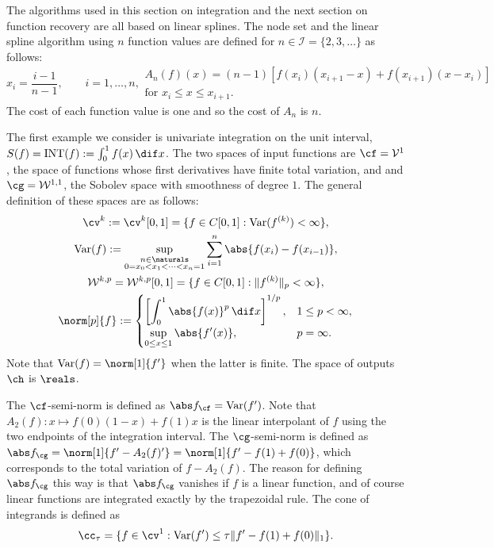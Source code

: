 The algorithms used in this section on integration and the next section on function recovery are all based on linear splines.  The node set and the linear spline algorithm using $n$ function values are defined for $n \in \mathcal{I}=\{2,3,\ldots\}$ as follows:
\begin{subequations} \label{linearspline}
\begin{equation}
x_i=\frac{i-1}{n-1}, \qquad i=1, \ldots, n,
\end{equation}
\begin{multline}
A_{n}(f)(x)=(n-1) \left[ f(x_{i})(x_{i+1}-x) +f(x_{i+1})(x-x_i) \right] \\ \text{for }x_i \leq x \leq x_{i+1}.
\end{multline}
\end{subequations}
The cost of each function value is one and so the cost of  $A_n$ is $n$.

The first example we consider is univariate integration on the unit interval, $S(f)=\INT(f):=\int_{0}^{1}f(x) \, \dif x$.  The two spaces of input functions are $\cf=\mathcal{V}^{1}$, the space of functions whose first derivatives have finite total variation, and and $\cg=\mathcal{W}^{1,1}$, the Sobolev space with smoothness of degree $1$.  The general definition of these spaces are as follows:
\begin{subequations} \label{defSobolev}
\begin{gather}
  \cv^{k}: =\cv^{k}[0,1]=\{f\in C[0,1]: \Var(f^{(k)}) < \infty \}, \\
  \Var(f) := \sup_{\substack{n \in \naturals\\ 0 = x_0 < x_1 < \cdots < x_{n} =1}} \sum_{i=1}^n \abs{f(x_i)-f(x_{i-1})}, \\
  \mathcal{W}^{k,p}=\mathcal{W}^{k,p}[0,1]=\{f\in C[0,1]: \|f^{(k)}\|_{p}<\infty\}, \\
\norm[p]{f}:= \begin{cases} \displaystyle \left[\int_0^1 \abs{f(x)}^p \, \dif x \right]^{1/p}, & 1 \le p < \infty,\\[1ex]
\displaystyle  \sup_{0 \le x \le 1} \abs{f'(x)}, & p=\infty.
\end{cases}
\end{gather}
\end{subequations}
Note that $\Var(f)=\norm[1]{f'}$ when the latter is finite.  The space of outputs $\ch$ is $\reals$.

The $\cf$-semi-norm is defined as $\Fnorm{f}=\Var(f')$.  Note that $A_2(f): x \mapsto f(0)(1-x)+f(1)x$ is the linear interpolant of $f$ using the two endpoints of the integration interval.  The $\cg$-semi-norm is defined as $\Gnorm{f}=\norm[1]{f'-A_2(f)'}=\norm[1]{f'-f(1)+f(0)}$, which corresponds to the total variation of $f-A_2(f)$.  The reason for defining $\Gnorm{f}$ this way is that $\Gnorm{f}$ vanishes if $f$ is a linear function, and of course linear functions are integrated exactly by the trapezoidal rule.  The cone of integrands is defined as
\begin{equation}\label{coneinteg}
\cc_{\tau}=\{f\in \cv^{1}:\Var(f')\leq\tau\|f'-f(1)+f(0)\|_1\}.
\end{equation}

